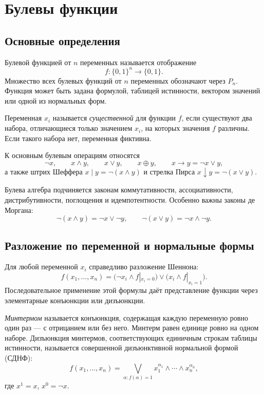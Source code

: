 \section{Булевы функции}
\label{sec:boolean-functions}

\subsection{Основные определения}

Булевой функцией от $n$ переменных называется отображение
\[
    f\colon \{0,1\}^{n}\to\{0,1\}.
\]
Множество всех булевых функций от $n$ переменных обозначают через $P_n$.
Функция может быть задана формулой, таблицей истинности, вектором значений или
одной из нормальных форм.

Переменная $x_i$ называется \emph{существенной} для функции $f$, если существуют два
набора, отличающиеся только значением $x_i$, на которых значения $f$ различны.
Если такого набора нет, переменная фиктивна.

К основным булевым операциям относятся
\[
\neg x,\qquad x\land y,\qquad x\lor y,\qquad
x\oplus y,\qquad x\to y=\neg x\lor y,
\]
а также штрих Шеффера $x\mid y=\neg(x\land y)$ и стрелка Пирса
$x\downarrow y=\neg(x\lor y)$.

Булева алгебра подчиняется законам коммутативности, ассоциативности,
дистрибутивности, поглощения и идемпотентности. Особенно важны законы де Моргана:
\[
    \neg(x\land y)=\neg x\lor\neg y,
    \qquad
    \neg(x\lor y)=\neg x\land\neg y.
\]

\subsection{Разложение по переменной и нормальные формы}

Для любой переменной $x_i$ справедливо разложение Шеннона:
\[
 f(x_1,\ldots,x_n)
 =\bigl(\neg x_i\land f|_{x_i=0}\bigr)
  \lor
  \bigl(x_i\land f|_{x_i=1}\bigr).
\]
Последовательное применение этой формулы даёт представление функции через
элементарные конъюнкции или дизъюнкции.

\emph{Минтермом} называется конъюнкция, содержащая каждую переменную ровно один раз
--- с отрицанием или без него. Минтерм равен единице ровно на одном наборе.
Дизъюнкция минтермов, соответствующих единичным строкам таблицы истинности,
называется совершенной дизъюнктивной нормальной формой (СДНФ):
\[
    f(x_1,\ldots,x_n)=
    \bigvee_{\alpha\colon f(\alpha)=1}
    x_1^{\alpha_1}\land\cdots\land x_n^{\alpha_n},
\]
где $x^1=x$, $x^0=\neg x$.

